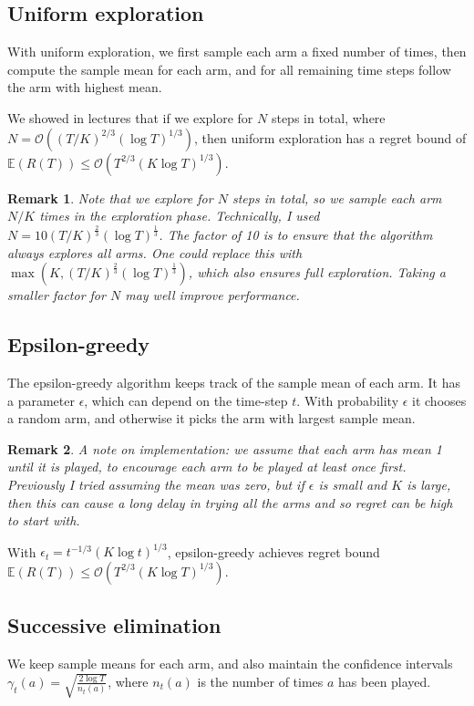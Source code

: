 \documentclass[10pt]{article}
\newtheorem{remark}{Remark}
\newcommand{\EE}{\mathbb{E}}
\newcommand{\bigoh}{\mathcal{O}}
\begin{document}
\subsection{Uniform exploration}
With uniform exploration, we first sample each arm a fixed number of times, then
compute the sample mean for each arm, and for all remaining time steps follow
the arm with highest mean.

We showed in lectures that if we explore for $N$ steps in total, where $N =
\bigoh((T/K)^{2/3} (\log T)^{1/3} )$, then uniform exploration has a regret
bound of $\EE(R(T)) \le \bigoh(T^{2/3} (K \log T)^{1/3})$.

\begin{remark}
    Note that we explore for $N$ steps in total, so we sample each arm $N / K$
    times in the exploration phase. Technically, I used $N = 10 (T /
    K)^{\frac{2}{3}} (\log T)^{\frac{1}{3}}$. The factor of 10 is to ensure that
    the algorithm always explores all arms. One could replace this with $\max(K,
    (T / K)^{\frac{2}{3}} (\log T)^{\frac{1}{3}})$, which also ensures full
    exploration. Taking a smaller factor for $N$ may well improve performance.
\end{remark}

\subsection{Epsilon-greedy}

The epsilon-greedy algorithm keeps track of the sample mean of each arm. It has
a parameter $\epsilon$, which can depend on the time-step $t$. With probability
$\epsilon$ it chooses a random arm, and otherwise it picks the arm with largest
sample mean.

\begin{remark}
    A note on implementation: we assume that each arm has mean 1 until it is
    played, to encourage each arm to be played at least once first. Previously I
    tried assuming the mean was zero, but if $\epsilon$ is small and $K$ is
    large, then this can cause a long delay in trying all the arms and so regret
    can be high to start with.
\end{remark}

With $\epsilon_t = t^{-1/3} (K \log t)^{1/3}$, epsilon-greedy achieves regret
bound $\EE(R(T)) \le \bigoh( T^{2/3} (K \log T)^{1/3} )$.

\subsection{Successive elimination}
We keep sample means for each arm, and also maintain the confidence intervals
$\gamma_t(a) = \sqrt{\frac{2 \log T}{n_t(a)}}$, where $n_t(a)$ is the number of
times $a$ has been played.
\end{document}
